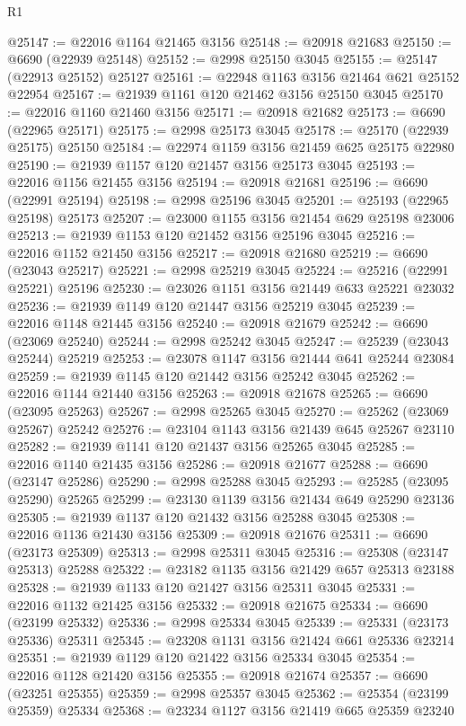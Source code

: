 \begin{lexlean}{R1}
\begin{coremodule}
@25147 := @22016 @1164 @21465 @3156
@25148 := @20918 @21683
@25150 := @6690 (@22939 @25148)
@25152 := @2998 @25150 @3045
@25155 := @25147 (@22913 @25152) @25127
@25161 := @22948 @1163 @3156 @21464 @621 @25152 @22954
@25167 := @21939 @1161 @120 @21462 @3156 @25150 @3045
@25170 := @22016 @1160 @21460 @3156
@25171 := @20918 @21682
@25173 := @6690 (@22965 @25171)
@25175 := @2998 @25173 @3045
@25178 := @25170 (@22939 @25175) @25150
@25184 := @22974 @1159 @3156 @21459 @625 @25175 @22980
@25190 := @21939 @1157 @120 @21457 @3156 @25173 @3045
@25193 := @22016 @1156 @21455 @3156
@25194 := @20918 @21681
@25196 := @6690 (@22991 @25194)
@25198 := @2998 @25196 @3045
@25201 := @25193 (@22965 @25198) @25173
@25207 := @23000 @1155 @3156 @21454 @629 @25198 @23006
@25213 := @21939 @1153 @120 @21452 @3156 @25196 @3045
@25216 := @22016 @1152 @21450 @3156
@25217 := @20918 @21680
@25219 := @6690 (@23043 @25217)
@25221 := @2998 @25219 @3045
@25224 := @25216 (@22991 @25221) @25196
@25230 := @23026 @1151 @3156 @21449 @633 @25221 @23032
@25236 := @21939 @1149 @120 @21447 @3156 @25219 @3045
@25239 := @22016 @1148 @21445 @3156
@25240 := @20918 @21679
@25242 := @6690 (@23069 @25240)
@25244 := @2998 @25242 @3045
@25247 := @25239 (@23043 @25244) @25219
@25253 := @23078 @1147 @3156 @21444 @641 @25244 @23084
@25259 := @21939 @1145 @120 @21442 @3156 @25242 @3045
@25262 := @22016 @1144 @21440 @3156
@25263 := @20918 @21678
@25265 := @6690 (@23095 @25263)
@25267 := @2998 @25265 @3045
@25270 := @25262 (@23069 @25267) @25242
@25276 := @23104 @1143 @3156 @21439 @645 @25267 @23110
@25282 := @21939 @1141 @120 @21437 @3156 @25265 @3045
@25285 := @22016 @1140 @21435 @3156
@25286 := @20918 @21677
@25288 := @6690 (@23147 @25286)
@25290 := @2998 @25288 @3045
@25293 := @25285 (@23095 @25290) @25265
@25299 := @23130 @1139 @3156 @21434 @649 @25290 @23136
@25305 := @21939 @1137 @120 @21432 @3156 @25288 @3045
@25308 := @22016 @1136 @21430 @3156
@25309 := @20918 @21676
@25311 := @6690 (@23173 @25309)
@25313 := @2998 @25311 @3045
@25316 := @25308 (@23147 @25313) @25288
@25322 := @23182 @1135 @3156 @21429 @657 @25313 @23188
@25328 := @21939 @1133 @120 @21427 @3156 @25311 @3045
@25331 := @22016 @1132 @21425 @3156
@25332 := @20918 @21675
@25334 := @6690 (@23199 @25332)
@25336 := @2998 @25334 @3045
@25339 := @25331 (@23173 @25336) @25311
@25345 := @23208 @1131 @3156 @21424 @661 @25336 @23214
@25351 := @21939 @1129 @120 @21422 @3156 @25334 @3045
@25354 := @22016 @1128 @21420 @3156
@25355 := @20918 @21674
@25357 := @6690 (@23251 @25355)
@25359 := @2998 @25357 @3045
@25362 := @25354 (@23199 @25359) @25334
@25368 := @23234 @1127 @3156 @21419 @665 @25359 @23240

\end{coremodule}
\end{lexlean}
